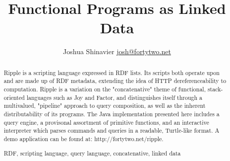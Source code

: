 \documentclass[runningheads]{llncs}
\newcommand{\keywords}[1]{\par\addvspace\baselineskip
\noindent\keywordname\enspace\ignorespaces#1}
\begin{document}
\mainmatter  %


\title{Functional Programs as Linked Data}


%
%
\author{
Joshua Shinavier
\newline
\url{josh@fortytwo.net}}
%


%
%

\maketitle


\begin{abstract}
Ripple is a scripting language expressed in RDF lists.  Its scripts both operate upon and are made up of RDF metadata, extending the idea of HTTP dereferenceability to computation.  Ripple is a variation on the "concatenative" theme of functional, stack-oriented languages such as Joy and Factor, and distinguishes itself through a multivalued, "pipeline" approach to query composition, as well as the inherent distributability of its programs.  The Java implementation presented here includes a query engine, a provisonal assortment of primitive functions, and an interactive interpreter which parses commands and queries in a readable, Turtle-like format.  A demo application can be found at:
    http://fortytwo.net/ripple.
\keywords{RDF, scripting language, query language, concatenative, linked data}
\end{abstract}
\end{document}
